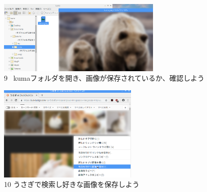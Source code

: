 \documentclass[a4paper,12pt]{jarticle}
\begin{document}
\begin{figure}[t]
  \begin{minipage}{\textwidth}
    \begin{minipage}{7.882cm}
      \includegraphics[width=7.872cm]{textbook-img102.png}\\
      9 \ kumaフォルダを開き、画像が保存されているか、確認しよう
    \end{minipage}
    \begin{minipage}{2.582cm}
    \end{minipage}
    \begin{minipage}{6.582cm}
      \includegraphics[width=6.71cm]{textbook-img101.png}\\
      10 うさぎで検索し好きな画像を保存しよう
    \end{minipage}
  \end{minipage}

  \vspace{60mm}

\end{figure}



\bigskip



\clearpage
\end{document}
